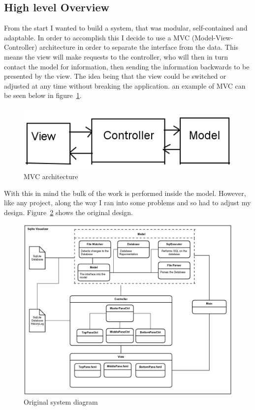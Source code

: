 \subsection{High level Overview}
\label{subsec:high_level_overview}

From the start I wanted to build a system, that was modular, self-contained and adaptable. In order to accomplish this I decide to use a MVC (Model-View-Controller) architecture in order to separate the interface from the data. This means the view will make requests to the controller, who will then in turn contact the model for information, then sending the information backwards to be presented by the view. The idea being that the view could be switched or adjusted at any time without breaking the application. an example of MVC can be seen below in figure~\ref{fig:mvc}.

\begin{figure}[H]
	\centering
	\includegraphics[scale=0.5]{images/mvc.png}
	\caption{MVC architecture}
	\label{fig:mvc}
\end{figure}

With this in mind the bulk of the work is performed inside the model. However, like any project, along the way I ran into some problems and so had to adjust my design. Figure~\ref{fig:design_old} shows the original design.

\begin{figure}[H]
	\centering
	\includegraphics[scale=0.2]{images/system_diagram_old.png}
	\caption{Original system diagram}
	\label{fig:design_old}
\end{figure}

